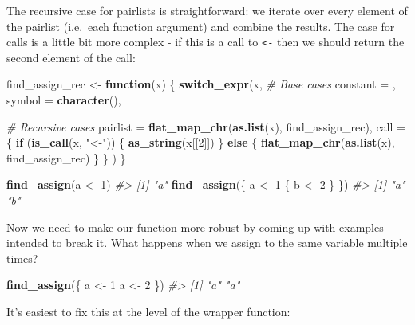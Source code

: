 \documentclass[]{book}
\newenvironment{Shaded}{\begin{snugshade}}{\end{snugshade}}
\newcommand{\CommentTok}[1]{\textcolor[rgb]{0.37,0.37,0.37}{\textit{#1}}}
\newcommand{\ControlFlowTok}[1]{\textcolor[rgb]{0.27,0.27,0.27}{\textbf{#1}}}
\newcommand{\DataTypeTok}[1]{\textcolor[rgb]{0.27,0.27,0.27}{#1}}
\newcommand{\DecValTok}[1]{\textcolor[rgb]{0.06,0.06,0.06}{#1}}
\newcommand{\KeywordTok}[1]{\textcolor[rgb]{0.27,0.27,0.27}{\textbf{#1}}}
\newcommand{\NormalTok}[1]{#1}
\newcommand{\StringTok}[1]{\textcolor[rgb]{0.5,0.5,0.5}{#1}}
\begin{document}
The recursive case for pairlists is straightforward: we iterate over every element of the pairlist (i.e.~each function argument) and combine the results. The case for calls is a little bit more complex - if this is a call to \texttt{\textless{}-} then we should return the second element of the call:

\begin{Shaded}
\begin{Highlighting}[]
\NormalTok{find_assign_rec <-}\StringTok{ }\ControlFlowTok{function}\NormalTok{(x) \{}
  \KeywordTok{switch_expr}\NormalTok{(x,}
    \CommentTok{# Base cases}
    \DataTypeTok{constant =}\NormalTok{ ,}
    \DataTypeTok{symbol =} \KeywordTok{character}\NormalTok{(),}

    \CommentTok{# Recursive cases}
    \DataTypeTok{pairlist =} \KeywordTok{flat_map_chr}\NormalTok{(}\KeywordTok{as.list}\NormalTok{(x), find_assign_rec),}
    \DataTypeTok{call =}\NormalTok{ \{}
      \ControlFlowTok{if}\NormalTok{ (}\KeywordTok{is_call}\NormalTok{(x, }\StringTok{"<-"}\NormalTok{)) \{}
        \KeywordTok{as_string}\NormalTok{(x[[}\DecValTok{2}\NormalTok{]])}
\NormalTok{      \} }\ControlFlowTok{else}\NormalTok{ \{}
        \KeywordTok{flat_map_chr}\NormalTok{(}\KeywordTok{as.list}\NormalTok{(x), find_assign_rec)}
\NormalTok{      \}}
\NormalTok{    \}}
\NormalTok{  )}
\NormalTok{\}}

\KeywordTok{find_assign}\NormalTok{(a <-}\StringTok{ }\DecValTok{1}\NormalTok{)}
\CommentTok{#> [1] "a"}
\KeywordTok{find_assign}\NormalTok{(\{}
\NormalTok{  a <-}\StringTok{ }\DecValTok{1}
\NormalTok{  \{}
\NormalTok{    b <-}\StringTok{ }\DecValTok{2}
\NormalTok{  \}}
\NormalTok{\})}
\CommentTok{#> [1] "a" "b"}
\end{Highlighting}
\end{Shaded}

Now we need to make our function more robust by coming up with examples intended to break it. What happens when we assign to the same variable multiple times?

\begin{Shaded}
\begin{Highlighting}[]
\KeywordTok{find_assign}\NormalTok{(\{}
\NormalTok{  a <-}\StringTok{ }\DecValTok{1}
\NormalTok{  a <-}\StringTok{ }\DecValTok{2}
\NormalTok{\})}
\CommentTok{#> [1] "a" "a"}
\end{Highlighting}
\end{Shaded}

It's easiest to fix this at the level of the wrapper function:
\end{document}

